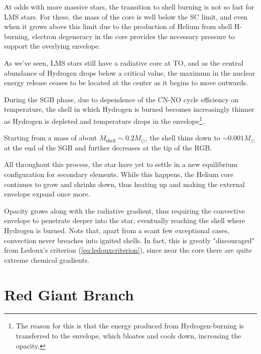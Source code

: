 At odds with more massive stars, the transition to shell burning is not so fast for LMS stars. For these, the mass of the core is well below the SC limit, and even when it grows above this limit due to the production of Helium from shell H-burning, electron degeneracy in the core provides the necessary pressure to support the overlying envelope.
\par As we've seen, LMS stars still have a radiative core at TO, and as the central abundance of Hydrogen drops below a critical value, the maximum in the nuclear energy release ceases to be located at the center as it begins to move outwards.
\par During the SGB phase, due to dependence of the CN-NO cycle efficiency on temperature, the shell in which Hydrogen is burned becomes increasingly thinner as Hydrogen is depleted and temperature drops in the envelope\footnote{The reason for this is that the energy produced from Hydrogen-burning is transferred to the envelope, which bloates and cools down, increasing the opacity.}.
\par Starting from a mass of about $M_{\text{shell}}\sim 0.2M_{\odot}$, the shell thins down to $\sim 0.001M_{\odot}$ at the end of the SGB and further decreases at the tip of the RGB.
\par All throughout this process, the star have yet to settle in a new equilibrium configuration for secondary elements. While this happens, the Helium core continues to grow and shrinks down, thus heating up and making the external envelope expand once more.
\par Opacity grows along with the radiative gradient, thus requiring the convective envelope to penetrate deeper into the star, eventually reaching the shell where Hydrogen is burned. Note that, apart from a scant few exceptional cases, convection never breaches into ignited shells. In fact, this is greatly "discouraged" from Ledoux's criterion (\ref{eq:ledouxcriterion}), since near the core there are quite extreme chemical gradients.

\section{Red Giant Branch}

